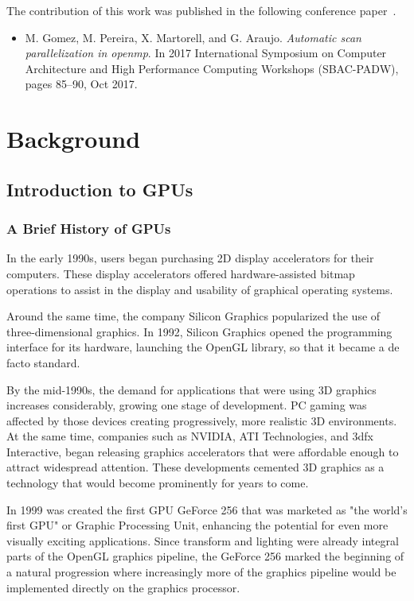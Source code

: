 \documentclass[Ingles]{ic-tese-v1}
\begin{document}
The contribution of this work was published in the following conference paper~\cite{maicol2017}.

\begin{itemize}
  \item M. Gomez, M. Pereira, X. Martorell, and G. Araujo. {\em Automatic scan
    parallelization in openmp}. In 2017 International Symposium on Computer
    Architecture and High Performance Computing Workshops (SBAC-PADW), pages
    85–90, Oct 2017.
\end{itemize}

\chapter{Background}
\label{cap:background}

\section{Introduction to GPUs}
\subsection{A Brief History of GPUs}
In the early 1990s, users began purchasing
2D display accelerators for their computers. These display accelerators
offered hardware-assisted bitmap operations to assist in the display and usability
of graphical operating systems.

Around the same time, the company Silicon Graphics popularized the use
of three-dimensional graphics. In 1992, Silicon Graphics opened the
programming interface for its hardware, launching the OpenGL library, so that it became a de facto standard.

By the mid-1990s, the demand for applications that were using 3D graphics
increases considerably, growing one stage of development. PC gaming was affected
by those devices creating progressively, more realistic 3D environments.
At the same time, companies such as NVIDIA, ATI Technologies,
and 3dfx Interactive, began releasing graphics accelerators that were affordable
enough to attract widespread attention. These developments cemented 3D
graphics as a technology that would become prominently for years to come.

In 1999 was created the first GPU GeForce 256 that was marketed as "the world's
first GPU" or Graphic Processing Unit, enhancing the potential
for even more visually exciting applications. Since transform and lighting were
already integral parts of the OpenGL graphics pipeline, the GeForce 256 marked
the beginning of a natural progression where increasingly more of the graphics
pipeline would be implemented directly on the graphics processor.
\end{document}
